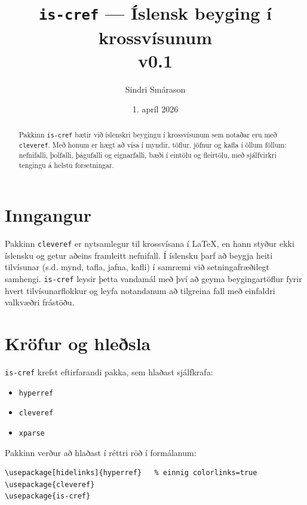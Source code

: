 \documentclass{article}
\title{\texttt{is-cref} --- Íslensk beyging í krossvísunum\\
  \large v0.1}
\author{Sindri Smárason}
\date{1. apríl 2026}
\begin{document}
\maketitle

\begin{abstract}
  Pakkinn \texttt{is-cref} bætir við íslenskri beygingu í krossvísunum
  sem notaðar eru með \texttt{cleveref}. Með honum er hægt að vísa í
  myndir, töflur, jöfnur og kafla í öllum föllum: nefnifalli, þolfalli,
  þágufalli og eignarfalli, bæði í eintölu og fleirtölu, með sjálfvirkri
  tengingu á helstu forsetningar.
\end{abstract}

\tableofcontents
\newpage

\section{Inngangur}

Pakkinn \texttt{cleveref} er nytsamlegur til krossvísana í LaTeX, en hann
styður ekki íslensku og getur aðeins framleitt nefnifall. Í íslensku
þarf að beygja heiti tilvísunar (s.d. mynd, tafla, jafna, kafli) í samræmi
við setningafræðilegt samhengi. \texttt{is-cref} leysir þetta vandamál
með því að geyma beygingartöflur fyrir hvert tilvísunarflokkur og leyfa
notandanum að tilgreina fall með einfaldri valkvæðri frástöðu.

\section{Kröfur og hleðsla}

\texttt{is-cref} krefst eftirfarandi pakka, sem hlaðast sjálfkrafa:

\begin{itemize}
  \item \texttt{hyperref}
  \item \texttt{cleveref}
  \item \texttt{xparse}
\end{itemize}

Pakkinn verður að hlaðast í réttri röð í formálanum:

\begin{lstlisting}
\usepackage[hidelinks]{hyperref}   % einnig colorlinks=true
\usepackage{cleveref}
\usepackage{is-cref}
\end{lstlisting}
\end{document}
